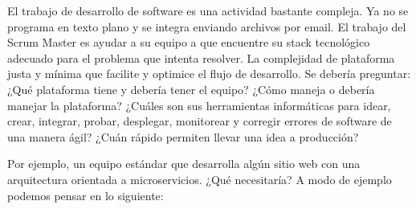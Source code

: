El trabajo de desarrollo de software es una actividad bastante compleja. Ya no se programa en texto plano y se integra enviando archivos por email. El trabajo del Scrum Master es ayudar a su equipo a que encuentre su stack tecnológico adecuado para el problema que intenta resolver. La complejidad de plataforma justa y mínima que facilite y optimice el flujo de desarrollo. Se debería preguntar: ¿Qué plataforma tiene y debería tener el equipo? ¿Cómo maneja o debería manejar la plataforma? ¿Cuáles son sus herramientas informáticas para idear, crear, integrar, probar, desplegar, monitorear y corregir errores de software de una manera ágil? ¿Cuán rápido permiten llevar una idea a producción?


Por ejemplo, un equipo estándar que desarrolla algún sitio web con una arquitectura orientada a microservicios. ¿Qué necesitaría? A modo de ejemplo podemos pensar en lo siguiente:
